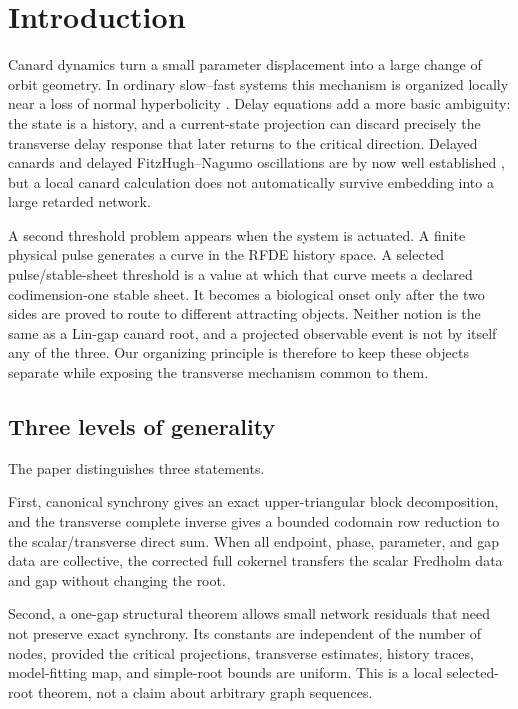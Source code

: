 \section{Introduction}\label{sec:introduction}

Canard dynamics turn a small parameter displacement into a large change of
orbit geometry.  In ordinary slow--fast systems this mechanism is organized
locally near a loss of normal hyperbolicity
\citep{krupa2001extending,krupa2001relaxation,wechselberger2012canards}.
Delay equations add a more basic ambiguity: the state is a history, and a
current-state projection can discard precisely the transverse delay response
that later returns to the critical direction.  Delayed canards and delayed
FitzHugh--Nagumo oscillations are by now well established
\citep{campbell2009delay,krupa2016complex,krupa2016explosion}, but a local
canard calculation does not automatically survive embedding into a large
retarded network.

A second threshold problem appears when the system is actuated.  A finite
physical pulse generates a curve in the RFDE history space.  A selected
pulse/stable-sheet threshold is a value at which that curve meets a declared
codimension-one stable sheet.  It becomes a biological onset only after the
two sides are proved to route to different attracting objects.  Neither
notion is the same as a Lin-gap canard root, and a projected observable event
is not by itself any of the three.  Our organizing principle is therefore to
keep these objects separate while exposing the transverse mechanism common
to them.

\subsection{Three levels of generality}

The paper distinguishes three statements.

First, canonical synchrony gives an exact upper-triangular block
decomposition, and the transverse complete inverse gives a bounded codomain
row reduction to the scalar/transverse direct sum.  When all endpoint, phase,
parameter, and gap data are collective, the corrected full cokernel
transfers the scalar Fredholm data and gap without changing the root.

Second, a one-gap structural theorem allows small network residuals that need
not preserve exact synchrony.  Its constants are independent of the number
of nodes, provided the critical projections, transverse estimates, history
traces, model-fitting map, and simple-root bounds are uniform.  This is a
local selected-root theorem, not a claim about arbitrary graph sequences.

